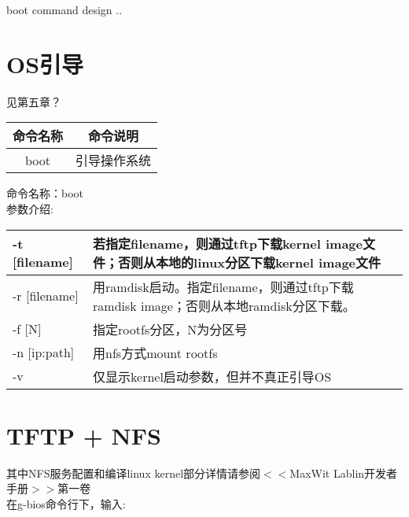 
%
%

boot command design ..

\section{OS引导}
见第五章？
\begin{table}[H]
\setlength{\parindent}{0pt}
\begin{tabular}{|c|c|}
\hline
 命令名称 & 命令说明\\
\hline
boot & 引导操作系统\\
\hline
\end{tabular}
\end{table}

\noindent{}命令名称：boot\\
参数介绍:\\
\begin{table}[H]
\setlength{\parindent}{0pt}
\begin{tabular}{|p{2.5cm}|p{8.5cm}|}
\hline
-t [filename] &若指定filename，则通过tftp下载kernel image文件；否则从本地的linux分区下载kernel image文件 \\ \hline
-r [filename] &用ramdisk启动。指定filename，则通过tftp下载ramdisk image；否则从本地ramdisk分区下载。 \\ \hline
-f [N] & 指定rootfs分区，N为分区号 \\ \hline
-n [ip:path] & 用nfs方式mount rootfs \\ \hline
-v &仅显示kernel启动参数，但并不真正引导OS \\ \hline
\end{tabular}
\end{table}
\section{TFTP + NFS}

\indent 其中NFS服务配置和编译linux kernel部分详情请参阅$<<$MaxWit Lablin开发者手册$>>$第一卷\\
\indent 在g-bios命令行下，输入:\\

